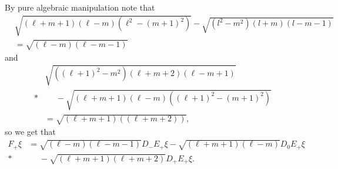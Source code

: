 By pure algebraic manipulation note that 
\begin{align*}
  &\sqrt{(\ell+m+1)(\ell-m)(\ell^2-(m+1)^2)} - \sqrt{(l^2-m^2)(l+m)(l-m-1)} \\
  &= \sqrt{(\ell-m)(\ell-m-1)}
\end{align*}
and
\begin{align*}
  &\sqrt{((\ell+1)^2-m^2)(\ell+m+2)(\ell-m+1)} \\*
  &\phantom{{}={}}{} - \sqrt{(\ell+m+1)(\ell-m)((\ell+1)^2-(m+1)^2)} \\
  &= \sqrt{(\ell+m+1)((\ell+m+2))},
\end{align*}
so we get that
\begin{align*}
  F_+ \xi &= \sqrt{(\ell-m)(\ell-m-1)} D_-E_+ \xi - \sqrt{(\ell+m+1)(\ell-m)} D_0E_+\xi \\*
  &\phantom{{}={}}{} - \sqrt{(\ell+m+1)(\ell+m+2)} D_+E_+\xi.
\end{align*}


